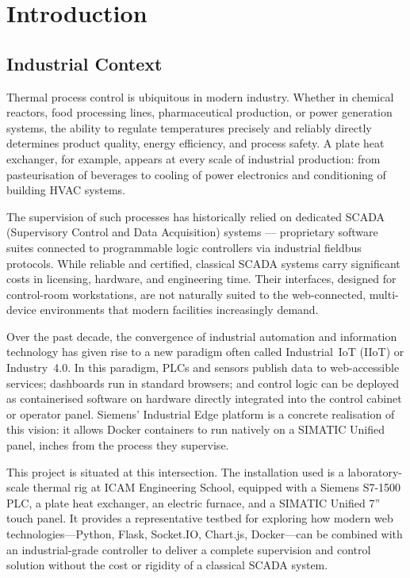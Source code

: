 \chapter{Introduction}

\section{Industrial Context}

Thermal process control is ubiquitous in modern industry. Whether in chemical reactors,
food processing lines, pharmaceutical production, or power generation systems, the ability
to regulate temperatures precisely and reliably directly determines product quality, energy
efficiency, and process safety. A plate heat exchanger, for example, appears at every scale
of industrial production: from pasteurisation of beverages to cooling of power electronics
and conditioning of building HVAC systems.

The supervision of such processes has historically relied on dedicated SCADA
(Supervisory Control and Data Acquisition) systems — proprietary software suites
connected to programmable logic controllers via industrial fieldbus protocols. While reliable
and certified, classical SCADA systems carry significant costs in licensing, hardware, and
engineering time. Their interfaces, designed for control-room workstations, are not naturally
suited to the web-connected, multi-device environments that modern facilities increasingly
demand.

Over the past decade, the convergence of industrial automation and information technology
has given rise to a new paradigm often called Industrial~IoT (IIoT) or Industry~4.0.
In this paradigm, PLCs and sensors publish data to web-accessible services; dashboards run
in standard browsers; and control logic can be deployed as containerised software on hardware
directly integrated into the control cabinet or operator panel. Siemens' Industrial Edge
platform is a concrete realisation of this vision: it allows Docker containers to run natively
on a SIMATIC Unified panel, inches from the process they supervise.

This project is situated at this intersection. The installation used is a laboratory-scale
thermal rig at ICAM Engineering School, equipped with a Siemens S7-1500 PLC, a plate heat
exchanger, an electric furnace, and a SIMATIC Unified 7\textquotedblright{} touch panel.
It provides a representative testbed for exploring how modern web technologies---Python,
Flask, Socket.IO, Chart.js, Docker---can be combined with an industrial-grade controller
to deliver a complete supervision and control solution without the cost or rigidity of a
classical SCADA system.

